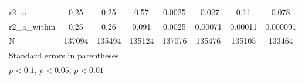{\begin{tabular}{l*{7}{c}}
\midrule
r2\_a                &        0.25         &        0.25         &        0.57         &      0.0025         &      -0.027         &        0.11         &       0.078         \\
r2\_a\_within         &        0.25         &        0.26         &       0.091         &      0.0025         &     0.00071         &     0.00011         &    0.000091         \\
N                   &      137094         &      135494         &      135124         &      137076         &      135476         &      135105         &      133464         \\
\bottomrule
\multicolumn{8}{l}{\footnotesize Standard errors in parentheses}\\
\multicolumn{8}{l}{\footnotesize \sym{*} \(p<0.1\), \sym{**} \(p<0.05\), \sym{***} \(p<0.01\)}\\
\end{tabular}
}
